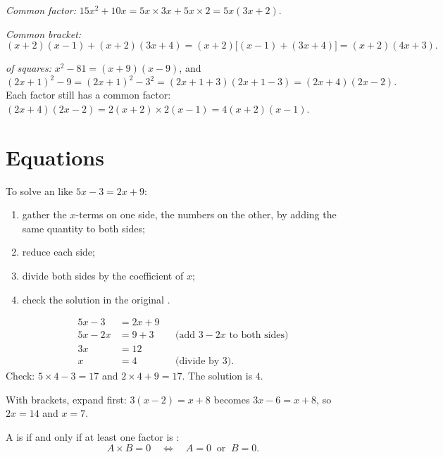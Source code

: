 \begin{example}\label{ex:g9:algebra:factor}
\emph{Common factor:}
$15x^2 + 10x = 5x \times 3x + 5x \times 2 = 5x(3x + 2)$.

\emph{Common bracket:}
\[
(x+2)(x-1) + (x+2)(3x+4) = (x+2)\bigl[(x-1) + (3x+4)\bigr]
= (x+2)(4x+3).
\]

\emph{ of squares:}
$x^2 - 81 = (x+9)(x-9)$, and
\[
(2x+1)^2 - 9 = (2x+1)^2 - 3^2 = (2x+1+3)(2x+1-3) = (2x+4)(2x-2).
\]
Each factor still has a common factor: $(2x+4)(2x-2) = 2(x+2) \times
2(x-1) = 4(x+2)(x-1)$.
\end{example}

\section{Equations}

\begin{method}\label{met:g9:algebra:firstdegree}
To solve an  like $5x - 3 = 2x + 9$:
\begin{enumerate}
  \item gather the $x$-terms on one side, the numbers on the other, by
        adding the same quantity to both sides;
  \item reduce each side;
  \item divide both sides by the coefficient of $x$;
  \item check the solution in the original .
\end{enumerate}
\end{method}

\begin{example}\label{ex:g9:algebra:firstdegree}
\begin{align*}
5x - 3 &= 2x + 9 \\
5x - 2x &= 9 + 3 && \text{(add $3 - 2x$ to both sides)}\\
3x &= 12 \\
x &= 4 && \text{(divide by 3).}
\end{align*}
Check: $5 \times 4 - 3 = 17$ and $2 \times 4 + 9 = 17$. The solution is
$4$.

With brackets, expand first: $3(x - 2) = x + 8$ becomes $3x - 6 = x + 8$,
so $2x = 14$ and $x = 7$.
\end{example}

\begin{theorem}\label{thm:g9:algebra:zeroproduct}
A  is  if and only if at least one factor is :
\[
A \times B = 0
\quad\Longleftrightarrow\quad
A = 0 \ \text{ or } \ B = 0 .
\]
\end{theorem}

